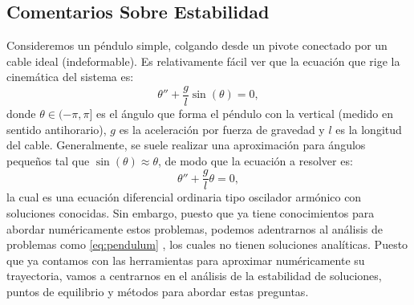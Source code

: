   \subsection{Comentarios Sobre Estabilidad}
  Consideremos un péndulo simple, colgando desde un pivote conectado por un cable ideal (indeformable). Es relativamente fácil ver que la ecuación que rige la cinemática del sistema es:
  \begin{equation}
    \theta'' + \frac{g}{l} \sin(\theta) = 0, \label{eq:pendulum}
  \end{equation}
 donde $\theta \in (-\pi, \pi]$ es el ángulo que forma el péndulo con la vertical (medido en sentido antihorario), $g$ es la aceleración por fuerza de gravedad y $l$ es la longitud del cable. 
Generalmente, se suele realizar una aproximación para ángulos pequeños tal que $\sin(\theta) \approx \theta$, de modo que la ecuación a resolver es:
$$
\theta'' + \frac{g}{l}\theta = 0,
$$
la cual es una ecuación diferencial ordinaria tipo oscilador armónico con soluciones conocidas. Sin embargo, puesto que ya tiene conocimientos para abordar numéricamente estos problemas, podemos adentrarnos al análisis de problemas como \eqref{eq:pendulum} , los cuales no tienen soluciones analíticas. Puesto que ya contamos con las herramientas para aproximar numéricamente su trayectoria, vamos a centrarnos en el análisis de la estabilidad de soluciones, puntos de equilibrio y métodos para abordar estas preguntas. 
